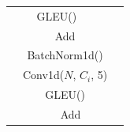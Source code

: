 \documentclass[10pt,twocolumn,letterpaper]{article}
\begin{document}
\begin{CJK}{UTF8}{bkai}
\begin{table}[t]
\begin{center}
\begin{tabular}{ | c c c c }
            \cline{2-2}
                                                                                        & \multicolumn{1}{|c|}{GLEU()}                                     & \multicolumn{1}{c|}{}                                                   & \multicolumn{1}{c|}{} \\
            \cline{2-3}
                                                                                        & \multicolumn{2}{|c|}{Add}                                        & \multicolumn{1}{c|}{}                                                                           \\
            \cline{2-3}
                                                                                        & \multicolumn{2}{|c|}{BatchNorm1d()}                              & \multicolumn{1}{c|}{}                                                                           \\
            \cline{2-3}
                                                                                        & \multicolumn{2}{|c|}{Conv1d($N$, $C_i$, 5)}                      & \multicolumn{1}{c|}{}                                                                           \\
            \cline{2-3}
                                                                                        & \multicolumn{2}{|c|}{GLEU()}                                     & \multicolumn{1}{c|}{}                                                                           \\
            \cline{2-4}
                                                                                        & \multicolumn{3}{|c|}{Add}                                                                                                                                          \\
            \hline
         \end{tabular}
      \end{center}
   \end{table}

\end{CJK}
\end{document}
